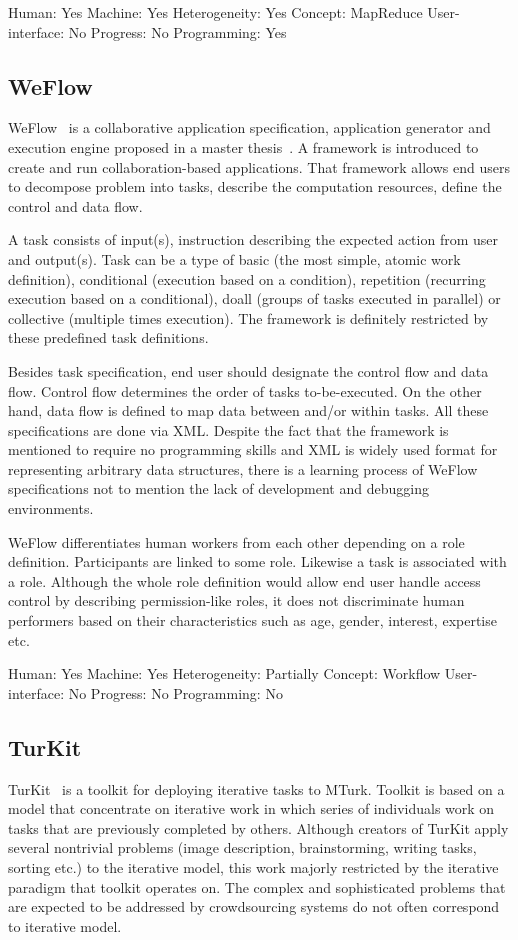Human: Yes
Machine: Yes
Heterogeneity: Yes
Concept: MapReduce
User-interface: No
Progress: No
Programming: Yes


\subsection{WeFlow}
WeFlow~\cite{Kokciyan2012} is a collaborative application specification, 
application generator and execution engine proposed in a master thesis~\cite{Kokciyan}. 
A framework is introduced to create and run collaboration-based applications. 
That framework allows end users to decompose problem into tasks, 
describe the computation resources, define the control and data flow.

A task consists of input(s), instruction describing the expected action from user 
and output(s). Task can be a type of basic (the most simple, atomic work definition), 
conditional (execution based on a condition), repetition (recurring execution based 
on a conditional), doall (groups of tasks executed in parallel) or collective 
(multiple times execution). The framework is definitely restricted by 
these predefined task definitions.

Besides task specification, end user should designate the control flow and 
data flow. Control flow determines the order of tasks to-be-executed. 
On the other hand, data flow is defined to map data between and/or within tasks. 
All these specifications are done via XML. Despite the fact that the framework 
is mentioned to require no programming skills and XML is widely used format 
for representing arbitrary data structures, there is a learning process of 
WeFlow specifications not to mention the lack of development 
and debugging environments.

WeFlow differentiates human workers from each other depending on a 
role definition. Participants are linked to some role. Likewise a task is associated 
with a role. Although the whole role definition would allow end user handle access 
control by describing permission-like roles, it does not discriminate human 
performers based on their characteristics such as age, gender, interest, expertise etc.

Human: Yes
Machine: Yes
Heterogeneity: Partially
Concept: Workflow
User-interface: No
Progress: No
Programming: No

\subsection{TurKit}
TurKit~\cite{Little2009} is a toolkit for deploying iterative tasks to MTurk. 
Toolkit is based on a model that concentrate on iterative work in which series of 
individuals work on tasks that are previously completed by others. Although 
creators of TurKit apply several nontrivial problems (image description, 
brainstorming, writing tasks, sorting etc.) to the iterative model, this work 
majorly restricted by the iterative paradigm that toolkit operates on. The complex 
and sophisticated problems that are expected to be addressed by crowdsourcing 
systems do not often correspond to iterative model.

